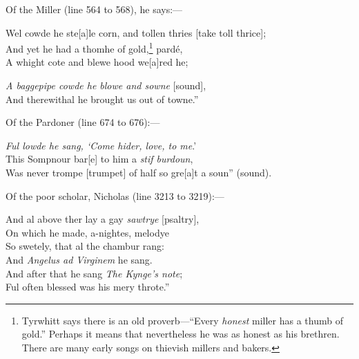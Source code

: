 Of the Miller (line 564 to 568), he says:—
\settowidth{\versewidth}{Was never trompe [trumpet] of half so gre[a]t a soun” (sound).}
\begin{scverse}Wel cowde he ste[a]le corn, and tollen thries [take toll thrice];\\
And yet he had a thomhe of gold,\footnote{
Tyrwhitt says there is an old proverb—“Every \textit{honest}
miller has a thumb of gold.” Perhaps it means that
nevertheless he was as honest as his brethren. There are
many early songs on thievish millers and bakers.
} pardé,\\
A whight cote and blewe hood we[a]red he;\\
\end{scverse}
\pagebreak
\begin{scverse}
\textit{A baggepipe cowde he blowe and sowne} [sound],\\
And therewithal he brought us out of towne.”
\end{scverse}
Of the Pardoner (line 674 to 676):—
\begin{scverse}\textit{Ful lowde he sang, ‘Come hider, love, to me}.’\\
This Sompnour bar[e] to him a \textit{stif burdoun},\\
Was never trompe [trumpet] of half so gre[a]t a soun” (sound).
\end{scverse}
Of the poor scholar, Nicholas (line 3213 to 3219):—
\begin{scverse}And al above ther lay a gay \textit{sawtrye} [psaltry],\\
On which he made, a-nightes, melodye\\
So swetely, that al the chambur rang:\\
And \textit{Angelus ad Virginem} he sang.\\
And after that he sang \textit{The Kynge’s note};\\
Ful often blessed was his mery throte.”
\end{scverse}
